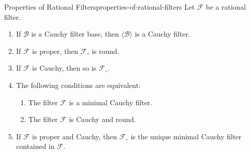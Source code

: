 \begin{lemma}{Properties of Rational Filters}{properties-of-rational-filters}%
    Let $\mathcal{F}$ be a rational filter.
    \begin{enumerate}
        \item\label{properties-of-rational-filters-filters-associated-to-cauchy-filter-bases-are-cauchy}If $\mathcal{B}$ is a Cauchy filter base, then $\langle\mathcal{B}\rangle$ is a Cauchy filter.
        \item\label{properties-of-rational-filters-the-roundification-of-a-proper-filter-is-round}If $\mathcal{F}$ is proper, then $\mathcal{F}_{\circ}$ is round.
        \item\label{properties-of-rational-filters-the-roundification-of-a-cauchy-filter-is-cauchy}If $\mathcal{F}$ is Cauchy, then so is $\mathcal{F}_{\circ}$.
        \item\label{properties-of-rational-filters-characterisation-of-minimal-cauchy-filters}The following conditions are equivalent:
            \begin{enumerate}
                \item\label{properties-of-rational-filters-characterisation-of-minimal-cauchy-filters-1}The filter $\mathcal{F}$ is a minimal Cauchy filter.
                \item\label{properties-of-rational-filters-characterisation-of-minimal-cauchy-filters-2}The filter $\mathcal{F}$ is Cauchy and round.
            \end{enumerate}
        \item\label{properties-of-rational-filters-the-minimal-cauchy-filter-contained-in-a-filter}If $\mathcal{F}$ is proper and Cauchy, then $\mathcal{F}_{\circ}$ is the unique minimal Cauchy filter contained in $\mathcal{F}$.
    \end{enumerate}
\end{lemma}
